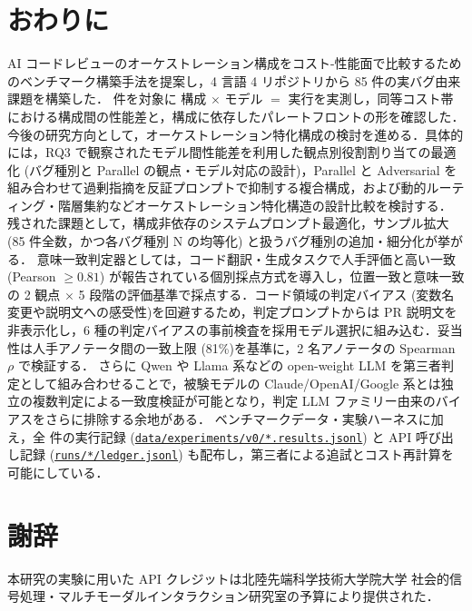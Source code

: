 \documentclass[a4j]{jarticle}
\begin{document}
\section{おわりに}

AI コードレビューのオーケストレーション構成をコスト-性能面で比較するためのベンチマーク構築手法を提案し，4 言語 4 リポジトリから 85 件の実バグ由来課題を構築した．
\nItems{} 件を対象に \nConfigs{} 構成 $\times$ \nModels{} モデル $=$ \nCombos{} 実行を実測し，同等コスト帯における構成間の性能差と，構成に依存したパレートフロントの形を確認した．
今後の研究方向として，オーケストレーション特化構成の検討を進める．具体的には，RQ3 で観察されたモデル間性能差を利用した観点別役割割り当ての最適化 (バグ種別と Parallel の観点・モデル対応の設計)，Parallel と Adversarial を組み合わせて過剰指摘を反証プロンプトで抑制する複合構成，および動的ルーティング・階層集約などオーケストレーション特化構造\cite{guo2024largelanguagemodelbased}の設計比較を検討する．
残された課題として，構成非依存のシステムプロンプト最適化，サンプル拡大 (85 件全数，かつ各バグ種別 N の均等化) と扱うバグ種別の追加・細分化が挙がる．
意味一致判定器としては，コード翻訳・生成タスクで人手評価と高い一致 (Pearson $\ge 0.81$) が報告されている個別採点方式\cite{wang2025llmsreplacehumanevaluators}を導入し，位置一致と意味一致の 2 観点 $\times$ 5 段階の評価基準で採点する．コード領域の判定バイアス (変数名変更や説明文への感受性)\cite{moon2025dontjudgecodecover}を回避するため，判定プロンプトからは PR 説明文を非表示化し，6 種の判定バイアスの事前検査を採用モデル選択に組み込む．妥当性は人手アノテータ間の一致上限 (81\%)\cite{zheng2023judgingllmasajudgemtbenchchatbot}を基準に，2 名アノテータの Spearman $\rho$ で検証する．
さらに Qwen や Llama 系などの open-weight LLM を第三者判定として組み合わせることで，被験モデルの Claude/OpenAI/Google 系とは独立の複数判定による一致度検証が可能となり，判定 LLM ファミリー由来のバイアスをさらに排除する余地がある．
ベンチマークデータ・実験ハーネスに加え，全 \nCombos{} 件の実行記録 (\href{https://github.com/hiroaki222/review-orchestration-bench/tree/main/data/experiments/v0}{\texttt{data/experiments/v0/*.results.jsonl}}) と API 呼び出し記録 (\href{https://github.com/hiroaki222/review-orchestration-bench/tree/main/runs}{\texttt{runs/*/ledger.jsonl}}) も配布し，第三者による追試とコスト再計算を可能にしている．

\section*{謝辞}
本研究の実験に用いた API クレジットは北陸先端科学技術大学院大学 社会的信号処理・マルチモーダルインタラクション研究室の予算により提供された．



\end{document}
